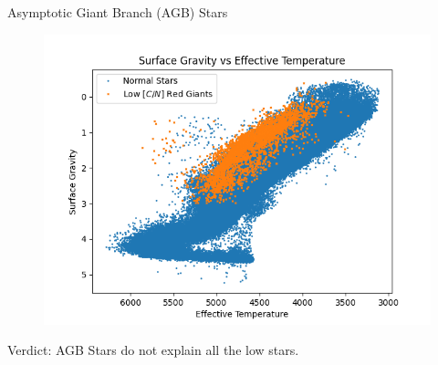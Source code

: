 \begin{frame}{Asymptotic Giant Branch (AGB) Stars}
    \begin{figure}
        \centering
        \includegraphics[width=0.5\columnwidth]{Figures/AGBProof.png}
    \end{figure}
    \begin{center}
        Verdict: AGB Stars do not explain all the low \CN stars.
    \end{center}
\end{frame}